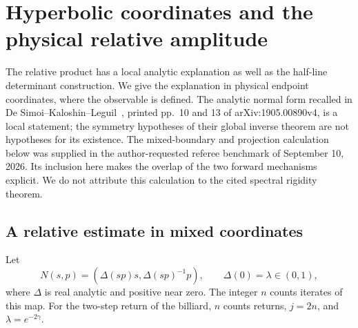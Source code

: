 \section{Hyperbolic coordinates and the physical relative amplitude}
\label{sec:v14-normal-form}
The relative product has a local analytic explanation as well as the
half-line determinant construction. We give the explanation in physical
endpoint coordinates, where the observable is defined. The analytic
normal form recalled in De Simoi--Kaloshin--Leguil~\cite{DSKL}, printed
pp.~10 and 13 of arXiv:1905.00890v4, is a local statement; the symmetry
hypotheses of their global inverse theorem are not hypotheses for its
existence. The mixed-boundary and projection calculation below was
supplied in the author-requested referee benchmark of September 10,
2026. Its inclusion here makes the overlap of the two forward mechanisms
explicit. We do not attribute this calculation to the cited spectral
rigidity theorem.

\subsection{A relative estimate in mixed coordinates}
Let
\begin{equation}\label{eq:v14-normal-form}
 N(s,p)=(\Delta(sp)s,\Delta(sp)^{-1}p),
 \qquad \Delta(0)=\lambda\in(0,1),
\end{equation}
where $\Delta$ is real analytic and positive near zero. The integer $n$
counts iterates of this map. For the two-step return of the billiard,
$n$ counts returns, $j=2n$, and $\lambda=e^{-2\gamma}$.

